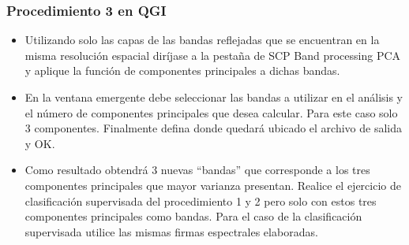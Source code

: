 \documentclass[a4paper,oneside,11pt,]{article}
\begin{document}
\subsubsection{Procedimiento 3 en QGI}
\begin{itemize}
\item Utilizando solo las capas de las bandas reflejadas que se encuentran en la misma resolución espacial diríjase a la pestaña de SCP Band processing PCA y aplique la función de componentes principales a dichas bandas. 
\item En la ventana emergente debe seleccionar las bandas a utilizar en el análisis y el número de componentes principales que desea calcular. Para este caso solo 3 componentes. Finalmente defina donde quedará ubicado el archivo de salida y OK.
\item Como resultado obtendrá 3 nuevas “bandas” que corresponde a los tres componentes principales que mayor varianza presentan. Realice el ejercicio de clasificación supervisada del procedimiento 1 y 2 pero solo con estos tres componentes principales como bandas. Para el caso de la clasificación supervisada utilice las mismas firmas espectrales elaboradas.
\end{itemize}
\end{document}
